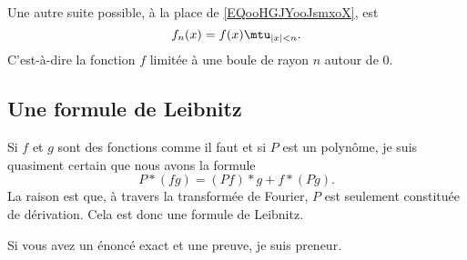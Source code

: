 \begin{remark}
	Une autre suite possible, à la place de \eqref{EQooHGJYooJsmxoX}, est
	\begin{equation}
		f_n(x)=f(x)\mtu_{| x |<n}.
	\end{equation}
	C'est-à-dire la fonction \( f\) limitée à une boule de rayon \( n\) autour de \( 0\).
\end{remark}

\subsection{Une formule de Leibnitz}

\begin{probleme}        \label{PROPooBTXLooFhuYSs}
	Si \( f\) et \( g\) sont des fonctions comme il faut et si \( P\) est un polynôme, je suis quasiment certain que nous avons la formule
	\begin{equation}
		P*(fg)=(Pf)*g+f*(Pg).
	\end{equation}
	La raison est que, à travers la transformée de Fourier, \( P\) est seulement constituée de dérivation. Cela est donc une formule de Leibnitz.

	Si vous avez un énoncé exact et une preuve, je suis preneur.
\end{probleme}
